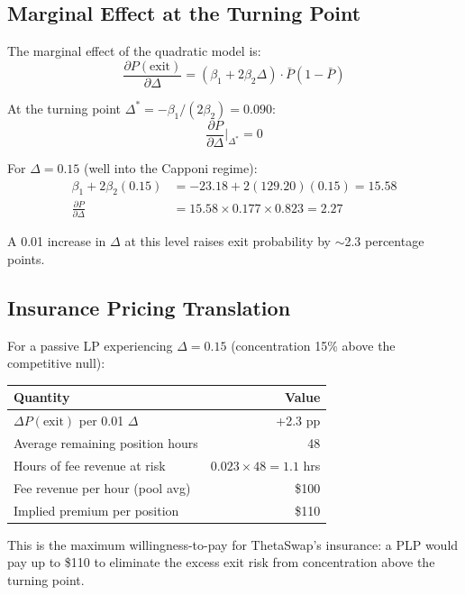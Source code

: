 \documentclass[11pt,a4paper]{article}
\begin{document}
\subsection{Marginal Effect at the Turning Point}

The marginal effect of the quadratic model is:
\begin{equation}\label{eq:marginal}
  \frac{\partial P(\text{exit})}{\partial \Delta} =
  \left(\beta_1 + 2\beta_2 \Delta\right) \cdot \bar P (1 - \bar P)
\end{equation}

At the turning point $\Delta^* = -\beta_1 / (2\beta_2) = 0.090$:
\[
  \frac{\partial P}{\partial \Delta}\bigg|_{\Delta^*} = 0
\]

For $\Delta = 0.15$ (well into the Capponi regime):
\begin{align}
  \beta_1 + 2\beta_2(0.15) &= -23.18 + 2(129.20)(0.15) = 15.58 \\
  \frac{\partial P}{\partial \Delta} &= 15.58 \times 0.177 \times 0.823
  = 2.27
\end{align}

A 0.01 increase in $\Delta$ at this level raises exit probability by
$\sim$2.3 percentage points.

\subsection{Insurance Pricing Translation}

For a passive LP experiencing $\Delta = 0.15$ (concentration 15\% above the
competitive null):

\begin{center}
\begin{tabular}{lr}
\toprule
Quantity & Value \\
\midrule
$\Delta P(\text{exit})$ per 0.01 $\Delta$ & +2.3 pp \\
Average remaining position hours & 48 \\
Hours of fee revenue at risk & $0.023 \times 48 = 1.1$ hrs \\
Fee revenue per hour (pool avg) & \$100 \\
Implied premium per position & \$110 \\
\bottomrule
\end{tabular}
\end{center}

This is the maximum willingness-to-pay for ThetaSwap's insurance: a PLP
would pay up to \$110 to eliminate the excess exit risk from concentration
above the turning point.
\end{document}
